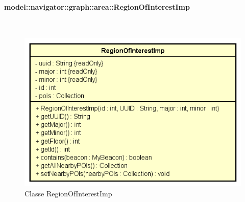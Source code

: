 \documentclass[../DefinizioneDiProdotto.tex]{subfiles}
\begin{document}
\paragraph{model::navigator::graph::area::RegionOfInterestImp}
\
\begin{figure}[H]
	\centering
	\includegraphics[width=\maxwidth]{img/RegionOfInterestImp.png}
	\caption{Classe RegionOfInterestImp}\label{fig:model::navigator::graph::area::RegionOfInterestImp} 
\end{figure}
\end{document}
